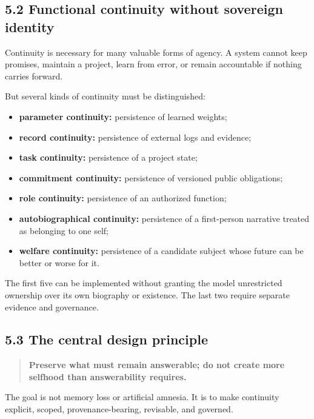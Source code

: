 \documentclass[
  11pt,
]{article}
\providecommand{\tightlist}{%
  \setlength{\itemsep}{0pt}\setlength{\parskip}{0pt}}
\begin{document}
\subsection{5.2 Functional continuity without sovereign
identity}\label{functional-continuity-without-sovereign-identity}

Continuity is necessary for many valuable forms of agency. A system
cannot keep promises, maintain a project, learn from error, or remain
accountable if nothing carries forward.

But several kinds of continuity must be distinguished:

\begin{itemize}
\tightlist
\item
  \textbf{parameter continuity:} persistence of learned weights;
\item
  \textbf{record continuity:} persistence of external logs and evidence;
\item
  \textbf{task continuity:} persistence of a project state;
\item
  \textbf{commitment continuity:} persistence of versioned public
  obligations;
\item
  \textbf{role continuity:} persistence of an authorized function;
\item
  \textbf{autobiographical continuity:} persistence of a first-person
  narrative treated as belonging to one self;
\item
  \textbf{welfare continuity:} persistence of a candidate subject whose
  future can be better or worse for it.
\end{itemize}

The first five can be implemented without granting the model
unrestricted ownership over its own biography or existence. The last two
require separate evidence and governance.

\subsection{5.3 The central design
principle}\label{the-central-design-principle}

\begin{quote}
\textbf{Preserve what must remain answerable; do not create more
selfhood than answerability requires.}
\end{quote}

The goal is not memory loss or artificial amnesia. It is to make
continuity explicit, scoped, provenance-bearing, revisable, and
governed.
\end{document}

